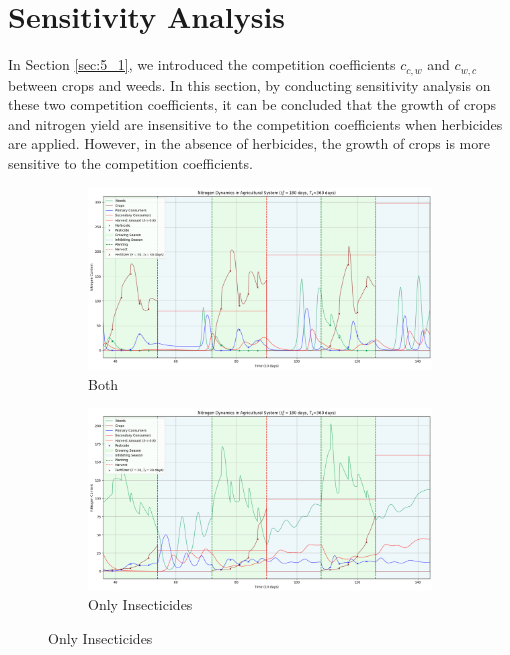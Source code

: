 \documentclass{mcmthesis}
\begin{document}
\section{Sensitivity Analysis}
In Section \ref{sec:5_1}, we introduced the competition coefficients $c_{c,w}$ and $c_{w,c}$ between crops and weeds. In this section, by conducting sensitivity analysis on these two competition coefficients, it can be concluded that the growth of crops and nitrogen yield are insensitive to the competition coefficients when herbicides are applied. However, in the absence of herbicides, the growth of crops is more sensitive to the competition coefficients.
\begin{figure}[h]
    \centering
    \begin{subfigure}[b]{0.3\textwidth}
        \centering
        \includegraphics[width=\textwidth]{figures/fig_sensi_chem_2.png}
        \caption{Both}
        \label{fig:sensi_sub1}
    \end{subfigure}
    \hfill 
    \begin{subfigure}[b]{0.3\textwidth}
        \centering
        \includegraphics[width=\textwidth]{figures/fig_sensi_chem_1.png}
        \caption{Only Insecticides}
        \label{fig:sensi_sub2}

\end{subfigure}
\end{figure}
\end{document}
